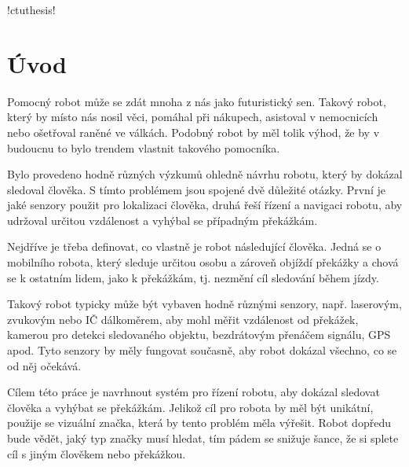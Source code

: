\documentclass[twoside]{ctuthesis}
\theoremstyle{plain}
\theoremstyle{definition}
\theoremstyle{note}
\begin{document}
	


\renewcommand \ctulstsep {0pt}

\newcommand\ctuclsname{\leavevmode\unhcopy\ctuclsnamebox}
\newsavebox\ctuclsnamebox
\begin{lrbox}{\ctuclsnamebox}
\ctulst!ctuthesis!
\end{lrbox}

\maketitle

\chapter{Úvod}

Pomocný robot může se zdát mnoha z nás jako futuristický sen. Takový robot, který by místo nás nosil věci, pomáhal při nákupech, asistoval v nemocnicích nebo ošetřoval raněné ve válkách. Podobný robot by měl tolik výhod, že by v budoucnu to bylo trendem vlastnit takového pomocníka.

Bylo provedeno hodně různých výzkumů ohledně návrhu robotu, který by dokázal sledoval člověka. S tímto problémem jsou spojené dvě důležité otázky. První je jaké senzory použit pro lokalizaci člověka, druhá řeší řízení a navigaci robotu, aby udržoval určitou vzdálenost a vyhýbal se případným překážkám.

Nejdříve je třeba definovat, co vlastně je robot následující člověka. Jedná se o mobilního robota, který sleduje určitou osobu
a zároveň objíždí překážky a chová se k ostatním lidem, jako k překážkám, tj. nezmění cíl sledování během jízdy.

Takový robot typicky může být vybaven hodně různými senzory, např. laserovým, zvukovým nebo IČ dálkoměrem, aby mohl měřit vzdálenost od překážek, kamerou pro detekci sledovaného objektu, bezdrátovým přenáčem signálu, GPS apod. Tyto senzory by měly fungovat současně, aby robot dokázal všechno, co se od něj očekává. 

Cílem této práce je navrhnout systém pro řízení robotu, aby dokázal sledovat člověka a vyhýbat se překážkám. Jelikož cíl pro robota by měl být unikátní, použije se vizuální značka, která by tento problém měla výřešit. Robot dopředu bude vědět, jaký typ značky musí hledat, tím pádem se snižuje šance, že si splete cíl s jiným člověkem nebo překážkou.
\end{document}
